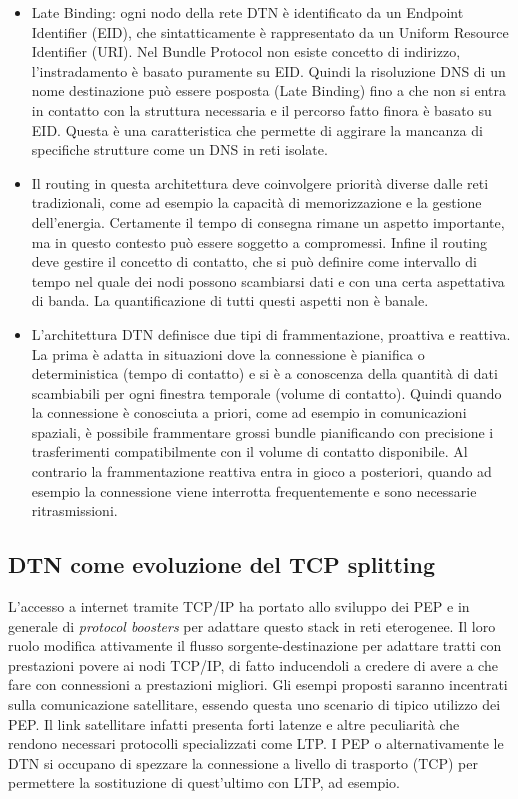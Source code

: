 \documentclass[a4paper]{article}
\begin{document}
\begin{itemize}
			\item Late Binding: ogni nodo della rete DTN è identificato da un Endpoint Identifier (EID), che sintatticamente è rappresentato da un Uniform Resource Identifier (URI). Nel Bundle Protocol non esiste concetto di indirizzo, l'instradamento è basato puramente su EID. Quindi la risoluzione DNS di un nome destinazione può essere posposta (Late Binding) fino a che non si entra in contatto con la struttura necessaria e il percorso fatto finora è basato su EID. Questa è una caratteristica che permette di aggirare la mancanza di specifiche strutture come un DNS in reti isolate.
			
			\item Il routing in questa architettura deve coinvolgere priorità diverse dalle reti tradizionali, come ad esempio la capacità di memorizzazione e la gestione dell'energia. Certamente il tempo di consegna rimane un aspetto importante, ma in questo contesto può essere soggetto a compromessi. Infine il routing deve gestire il concetto di contatto, che si può definire come intervallo di tempo nel quale dei nodi possono scambiarsi dati e con una certa aspettativa di banda. La  quantificazione di tutti questi aspetti non è banale.
			
			\item L'architettura DTN definisce due tipi di frammentazione, proattiva e reattiva. La prima è adatta in situazioni dove la connessione è pianifica o deterministica (tempo di contatto) e si è a conoscenza della quantità di dati scambiabili per ogni finestra temporale (volume di contatto). Quindi quando la connessione è conosciuta a priori, come ad esempio in comunicazioni spaziali, è possibile frammentare grossi bundle pianificando con precisione i trasferimenti compatibilmente con il volume di contatto disponibile.
			Al contrario la frammentazione reattiva entra in gioco a posteriori, quando ad esempio la connessione viene interrotta frequentemente e sono necessarie ritrasmissioni.
			
			
		\end{itemize}
		
		
		
		\subsection{DTN come evoluzione del TCP splitting}
		L'accesso a internet tramite TCP/IP ha portato allo sviluppo dei PEP e in generale di {\it protocol boosters } per adattare questo stack in reti eterogenee. Il loro ruolo modifica attivamente il flusso sorgente-destinazione per adattare tratti con prestazioni povere ai nodi TCP/IP, di fatto inducendoli a credere di avere a che fare con connessioni a prestazioni migliori. Gli esempi proposti saranno incentrati sulla comunicazione satellitare, essendo questa uno scenario di tipico utilizzo dei PEP. Il link satellitare infatti presenta forti latenze e altre peculiarità che rendono necessari protocolli specializzati come LTP. I PEP o alternativamente le DTN si occupano di spezzare la connessione a livello di trasporto (TCP) per permettere la sostituzione di quest'ultimo con LTP, ad esempio. 
		
\end{document}
